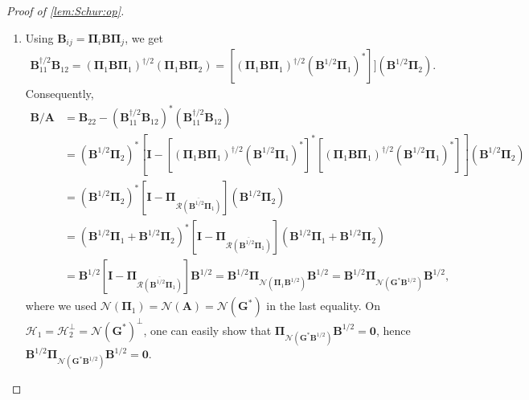 \documentclass[noinfoline]{imsart}\setcounter{tocdepth}{2}
\newcommand{\m}[1]{\mathbf{#1}} %
\renewcommand{\c}[1]{\mathcal{#1}} %
\theoremstyle{plain}
\begin{document}
\begin{proof}[Proof of \cref{lem:Schur:op}]
\begin{enumerate}[leftmargin=*]
\item Using $\m{B}_{ij} = \m{\Pi}_{i} \m{B} \m{\Pi}_{j}$, we get
\begin{align*}
    \m{B}_{11}^{\dagger/2} \m{B}_{12} = (\m{\Pi}_{1} \m{B} \m{\Pi}_{1})^{\dagger/2} (\m{\Pi}_{1} \m{B} \m{\Pi}_{2}) = [(\m{\Pi}_{1} \m{B} \m{\Pi}_{1})^{\dagger/2} (\m{B}^{1/2} \m{\Pi}_{1})^{*}]] (\m{B}^{1/2} \m{\Pi}_{2}).
\end{align*}
Consequently,
\begin{align*}
    \m{B}/\m{A} &= \m{B}_{22} - (\m{B}_{11}^{\dagger/2} \m{B}_{12})^{*} (\m{B}_{11}^{\dagger/2} \m{B}_{12}) \\
    &= (\m{B}^{1/2} \m{\Pi}_{2})^{*} [\m{I} - [(\m{\Pi}_{1} \m{B} \m{\Pi}_{1})^{\dagger/2} (\m{B}^{1/2} \m{\Pi}_{1})^{*}]^{*} [(\m{\Pi}_{1} \m{B} \m{\Pi}_{1})^{\dagger/2} (\m{B}^{1/2} \m{\Pi}_{1})^{*}]] (\m{B}^{1/2} \m{\Pi}_{2}) \\
    &= (\m{B}^{1/2} \m{\Pi}_{2})^{*} [\m{I} - \m{\Pi}_{\overline{\c{R}(\m{B}^{1/2} \m{\Pi}_{1})}}] (\m{B}^{1/2} \m{\Pi}_{2}) \\
    &= (\m{B}^{1/2} \m{\Pi}_{1} + \m{B}^{1/2} \m{\Pi}_{2})^{*} [\m{I} - \m{\Pi}_{\overline{\c{R}(\m{B}^{1/2} \m{\Pi}_{1})}}] (\m{B}^{1/2} \m{\Pi}_{1} + \m{B}^{1/2} \m{\Pi}_{2}) \\
    &= \m{B}^{1/2} [\m{I} - \m{\Pi}_{\overline{\c{R}(\m{B}^{1/2} \m{\Pi}_{1})}}] \m{B}^{1/2} 
    = \m{B}^{1/2} \m{\Pi}_{\c{N}(\m{\Pi}_{1} \m{B}^{1/2})} \m{B}^{1/2} 
    = \m{B}^{1/2} \m{\Pi}_{\c{N}(\m{G}^{*} \m{B}^{1/2})} \m{B}^{1/2}, 
\end{align*}
where we used $\c{N}(\m{\Pi}_{1}) = \c{N}(\m{A}) = \c{N}(\m{G}^{*})$ in the last equality. On $\c{H}_{1} = \c{H}_{2}^{\perp} = \c{N}(\m{G}^{*})^{\perp}$, one can easily show that $\m{\Pi}_{\c{N}(\m{G}^{*} \m{B}^{1/2})} \m{B}^{1/2} = \m{0}$, hence $\m{B}^{1/2} \m{\Pi}_{\c{N}(\m{G}^{*} \m{B}^{1/2})} \m{B}^{1/2} = \m{0}$.

\end{enumerate}
\end{proof}
\end{document}
